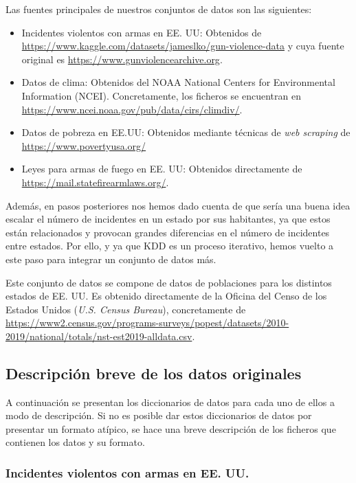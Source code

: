 \documentclass[11pt,a4paper]{article}
\begin{document}
Las fuentes principales de nuestros conjuntos de datos son las siguientes:

\begin{itemize}
    \item Incidentes violentos con armas en EE. UU: Obtenidos de \url{https://www.kaggle.com/datasets/jameslko/gun-violence-data} y cuya fuente original es \url{https://www.gunviolencearchive.org}.
    \item Datos de clima: Obtenidos del NOAA National Centers for Environmental Information (NCEI). Concretamente, los ficheros se encuentran en \url{https://www.ncei.noaa.gov/pub/data/cirs/climdiv/}.
    \item Datos de pobreza en EE.UU: Obtenidos mediante técnicas de \textit{web scraping} de \url{https://www.povertyusa.org/}
    \item Leyes para armas de fuego en EE. UU: Obtenidos directamente de \url{https://mail.statefirearmlaws.org/}.
\end{itemize}

Además, en pasos posteriores nos hemos dado cuenta de que sería una buena idea escalar el número de incidentes en un estado por sus habitantes, ya que estos están relacionados y provocan grandes diferencias en el número de incidentes entre estados. Por ello, y ya que KDD es un proceso iterativo, hemos vuelto a este paso para integrar un conjunto de datos más.

Este conjunto de datos se compone de datos de poblaciones para los distintos estados de EE. UU. Es obtenido directamente de la Oficina del Censo de los Estados Unidos (\textit{U.S. Census Bureau}), concretamente de \url{https://www2.census.gov/programs-surveys/popest/datasets/2010-2019/national/totals/nst-est2019-alldata.csv}.

\subsection{Descripción breve de los datos originales}

A continuación se presentan los diccionarios de datos para cada uno de ellos a modo de descripción. Si no es posible dar estos diccionarios de datos por presentar un formato atípico, se hace una breve descripción de los ficheros que contienen los datos y su formato.

\subsubsection*{Incidentes violentos con armas en EE. UU.}
\end{document}

